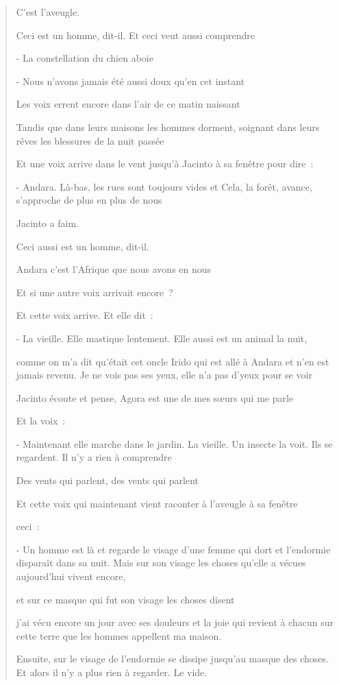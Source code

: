 \begin{quote}
C'est l'aveugle.

Ceci est un homme, dit-il. Et ceci veut aussi comprendre

- La constellation du chien aboie

- Nous n'avons jamais été aussi doux qu'en cet instant

Les voix errent encore dans l'air de ce matin naissant

Tandis que dans leurs maisons les hommes dorment, soignant dans leurs
rêves les blessures de la nuit passée

Et une voix arrive dans le vent jusqu'à Jacinto à sa fenêtre pour dire~:

- Andara. Là-bas, les rues sont toujours vides et Cela, la forêt,
avance, s'approche de plus en plus de nous

Jacinto a faim.

Ceci aussi est un homme, dit-il.

Andara c'est l'Afrique que nous avons en nous

Et si une autre voix arrivait encore~?

Et cette voix arrive. Et elle dit~:

- La vieille. Elle mastique lentement. Elle aussi est un animal la nuit,

comme on m'a dit qu'était cet oncle Irido qui est allé à Andara et n'en
est jamais revenu. Je ne vois pas ses yeux, elle n'a pas d'yeux pour se
voir

Jacinto écoute et pense, Agora est une de mes sœurs qui me parle

Et la voix~:

- Maintenant elle marche dans le jardin. La vieille. Un insecte la voit.
Ils se regardent. Il n'y a rien à comprendre

Des vents qui parlent, des vents qui parlent

Et cette voix qui maintenant vient raconter à l'aveugle à sa fenêtre

ceci~:

- Un homme est là et regarde le visage d'une femme qui dort et
l'endormie disparaît dans sa nuit. Mais sur son visage les choses
qu'elle a vécues aujourd'hui vivent encore,

et sur ce masque qui fut son visage les choses disent

j'ai vécu encore un jour avec ses douleurs et la joie qui revient à
chacun sur cette terre que les hommes appellent ma maison.

Ensuite, sur le visage de l'endormie se dissipe jusqu'au masque des
choses. Et alors il n'y a plus rien à regarder. Le vide.


\end{quote}
